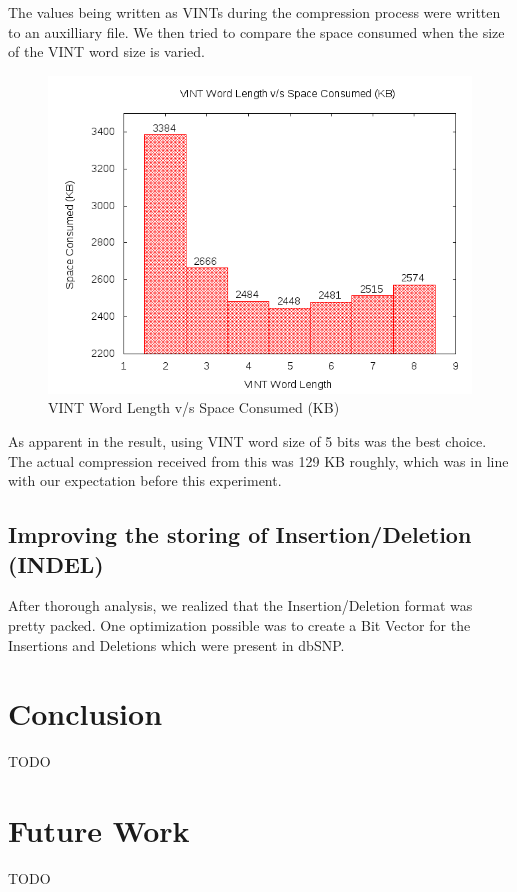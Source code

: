 \documentclass{article}
\begin{document}
The values being written as VINTs during the compression process were written to an auxilliary file. We then tried to compare the space consumed when the size of the VINT word size is varied. 

\begin{figure}[htp]
\centering
\includegraphics[scale=0.4]{images/VINT.png}
\caption{VINT Word Length v/s Space Consumed (KB)}\label{fig:fs}
\end{figure}

As apparent in the result, using VINT word size of 5 bits was the best choice. The actual compression received from this was 129 KB roughly, which was in line with our expectation before this experiment.

\clearpage

\subsection {Improving the storing of Insertion/Deletion (INDEL)}
After thorough analysis, we realized that the Insertion/Deletion format was pretty packed. One optimization possible was to create a Bit Vector for the Insertions and Deletions which were present in dbSNP.
\clearpage

\section {Conclusion}
TODO
\clearpage

\section {Future Work}
TODO
\clearpage
\end{document}
